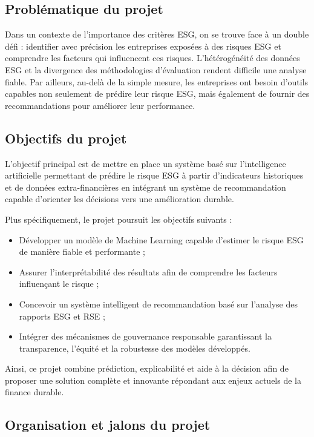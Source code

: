 \subsection{Problématique du projet}
Dans un contexte de l'importance des critères ESG, on se trouve face à un double défi : identifier avec précision les entreprises exposées à des risques ESG et comprendre les facteurs qui influencent ces risques. L’hétérogénéité des données ESG et la divergence des méthodologies d’évaluation rendent difficile une analyse fiable. Par ailleurs, au-delà de la simple mesure, les entreprises ont besoin d’outils capables non seulement de prédire leur risque ESG, mais également de fournir des recommandations pour améliorer leur performance.


\subsection{Objectifs du projet}


L’objectif principal est de mettre en place un système basé sur l’intelligence artificielle permettant de prédire le risque ESG à partir d’indicateurs historiques et de données extra-financières en intégrant un système de recommandation capable d’orienter les décisions vers une amélioration durable.

Plus spécifiquement, le projet poursuit les objectifs suivants :

\begin{itemize}
    \item Développer un modèle de Machine Learning capable d’estimer le risque ESG de manière fiable et performante ;
    
    \item Assurer l’interprétabilité des résultats afin de comprendre les facteurs influençant le risque ;
    
    \item Concevoir un système intelligent de recommandation basé sur l’analyse des rapports ESG et RSE ;
    
    \item Intégrer des mécanismes de gouvernance responsable garantissant la transparence, l’équité et la robustesse des modèles développés.
\end{itemize}

Ainsi, ce projet combine prédiction, explicabilité et aide à la décision afin de proposer une solution complète et innovante répondant aux enjeux actuels de la finance durable.


\subsection{Organisation et jalons du projet}

